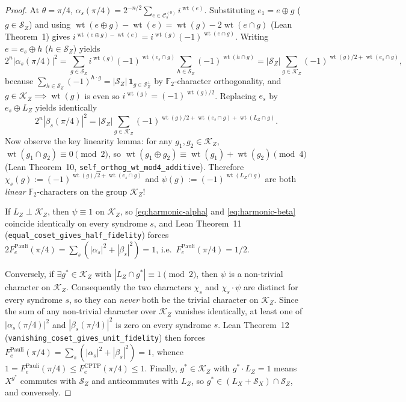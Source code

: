 \documentclass[11pt,a4paper]{article}
\theoremstyle{plain}
\theoremstyle{definition}
\newcommand{\Ftwo}{\mathbb{F}_2}
\newcommand{\SZ}{\mathcal{S}_Z}
\newcommand{\SX}{\mathcal{S}_X}
\newcommand{\KZ}{\mathcal{K}_Z}
\newcommand{\wt}{\operatorname{wt}}
\begin{document}
\begin{proof}
At $\theta = \pi/4$, $\alpha_s(\pi/4) = 2^{-n/2}\sum_{e \in \mathcal{C}_s^{(0)}} i^{\wt(e)}$. Substituting $e_1 = e \oplus g$ ($g \in \SZ$) and using $\wt(e \oplus g) - \wt(e) = \wt(g) - 2\wt(e \cap g)$ (Lean Theorem~1) gives $i^{\wt(e\oplus g)-\wt(e)} = i^{\wt(g)}(-1)^{\wt(e\cap g)}$. Writing $e = e_s \oplus h$ ($h \in \SZ$) yields
\begin{equation}
  2^n |\alpha_s(\pi/4)|^2 = \sum_{g \in \SZ} i^{\wt(g)} (-1)^{\wt(e_s \cap g)} \sum_{h \in \SZ} (-1)^{\wt(h \cap g)}
  = |\SZ| \sum_{g \in \KZ} (-1)^{\wt(g)/2 + \wt(e_s \cap g)},
  \label{eq:harmonic-alpha}
\end{equation}
because $\sum_{h \in \SZ} (-1)^{h \cdot g} = |\SZ|\,\mathbf{1}_{g \in \SZ^\perp}$ by $\Ftwo$-character orthogonality, and $g \in \KZ \implies \wt(g)$ is even so $i^{\wt(g)} = (-1)^{\wt(g)/2}$. Replacing $e_s$ by $e_s \oplus L_Z$ yields identically
\begin{equation}
  2^n |\beta_s(\pi/4)|^2 = |\SZ| \sum_{g \in \KZ} (-1)^{\wt(g)/2 + \wt(e_s \cap g) + \wt(L_Z \cap g)}.
  \label{eq:harmonic-beta}
\end{equation}
Now observe the key linearity lemma: for any $g_1, g_2 \in \KZ$, $\wt(g_1 \cap g_2) \equiv 0 \pmod 2$, so $\wt(g_1 \oplus g_2) \equiv \wt(g_1) + \wt(g_2) \pmod 4$ (Lean Theorem~10, \texttt{self\_orthog\_wt\_mod4\_additive}). Therefore $\chi_s(g) := (-1)^{\wt(g)/2 + \wt(e_s \cap g)}$ and $\psi(g) := (-1)^{\wt(L_Z \cap g)}$ are both \emph{linear} $\Ftwo$-characters on the group $\KZ$!

If $L_Z \perp \KZ$, then $\psi \equiv 1$ on $\KZ$, so \eqref{eq:harmonic-alpha} and \eqref{eq:harmonic-beta} coincide identically on every syndrome $s$, and Lean Theorem~11 (\texttt{equal\_coset\_gives\_half\_fidelity}) forces $2 F_e^{\mathrm{Pauli}}(\pi/4) = \sum_s (|\alpha_s|^2 + |\beta_s|^2) = 1$, i.e.\ $F_e^{\mathrm{Pauli}}(\pi/4) = 1/2$.

Conversely, if $\exists g^* \in \KZ$ with $|L_Z \cap g^*| \equiv 1 \pmod 2$, then $\psi$ is a non-trivial character on $\KZ$. Consequently the two characters $\chi_s$ and $\chi_s \cdot \psi$ are distinct for every syndrome $s$, so they can \emph{never} both be the trivial character on $\KZ$. Since the sum of any non-trivial character over $\KZ$ vanishes identically, at least one of $|\alpha_s(\pi/4)|^2$ and $|\beta_s(\pi/4)|^2$ is zero on every syndrome $s$. Lean Theorem~12 (\texttt{vanishing\_coset\_gives\_unit\_fidelity}) then forces $F_e^{\mathrm{Pauli}}(\pi/4) = \sum_s (|\alpha_s|^2 + |\beta_s|^2) = 1$, whence $1 = F_e^{\mathrm{Pauli}}(\pi/4) \le F_e^{\mathrm{CPTP}}(\pi/4) \le 1$. Finally, $g^* \in \KZ$ with $g^* \cdot L_Z = 1$ means $X^{g^*}$ commutes with $\SZ$ and anticommutes with $L_Z$, so $g^* \in (L_X + \SX) \cap \SZ$, and conversely.
\end{proof}
\end{document}
